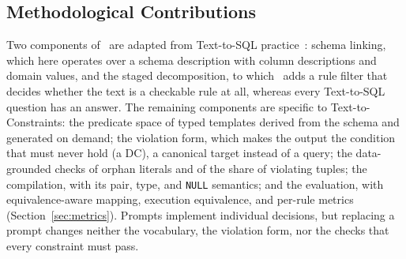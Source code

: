 \subsection{Methodological Contributions}
\label{sec:mapper:novelty}

Two components of \system\ are adapted from Text-to-SQL practice~\cite{resdsql2023,pourreza2023din}: schema linking, which here operates over a schema description with column descriptions and domain values, and the staged decomposition, to which \system\ adds a rule filter that decides whether the text is a checkable rule at all, whereas every Text-to-SQL question has an answer. The remaining components are specific to Text-to-Constraints: the predicate space of typed templates derived from the schema and generated on demand; the violation form, which makes the output the condition that must never hold (a DC), a canonical target instead of a query; the data-grounded checks of orphan literals and of the share of violating tuples; the compilation, with its pair, type, and \texttt{NULL} semantics; and the evaluation, with equivalence-aware mapping, execution equivalence, and per-rule metrics (Section~\ref{sec:metrics}). Prompts implement individual decisions, but replacing a prompt changes neither the vocabulary, the violation form, nor the checks that every constraint must pass.
